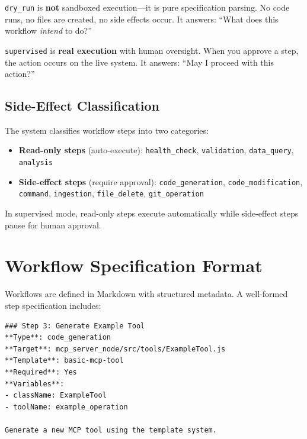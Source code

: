 \documentclass[11pt,letterpaper]{article}
\begin{document}
\begin{keyinsight}
\texttt{dry\_run} is \textbf{not} sandboxed execution---it is pure specification parsing. No code runs, no files are created, no side effects occur. It answers: ``What does this workflow \textit{intend} to do?''

\texttt{supervised} is \textbf{real execution} with human oversight. When you approve a step, the action occurs on the live system. It answers: ``May I proceed with this action?''
\end{keyinsight}

\subsection{Side-Effect Classification}

The system classifies workflow steps into two categories:

\begin{itemize}
    \item \textbf{Read-only steps} (auto-execute): \texttt{health\_check}, \texttt{validation}, \texttt{data\_query}, \texttt{analysis}
    \item \textbf{Side-effect steps} (require approval): \texttt{code\_generation}, \texttt{code\_modification}, \texttt{command}, \texttt{ingestion}, \texttt{file\_delete}, \texttt{git\_operation}
\end{itemize}

In supervised mode, read-only steps execute automatically while side-effect steps pause for human approval.

\section{Workflow Specification Format}

Workflows are defined in Markdown with structured metadata. A well-formed step specification includes:

\begin{lstlisting}[caption={Example Workflow Step Specification}]
### Step 3: Generate Example Tool
**Type**: code_generation
**Target**: mcp_server_node/src/tools/ExampleTool.js
**Template**: basic-mcp-tool
**Required**: Yes
**Variables**:
- className: ExampleTool
- toolName: example_operation

Generate a new MCP tool using the template system.
\end{lstlisting}
\end{document}
